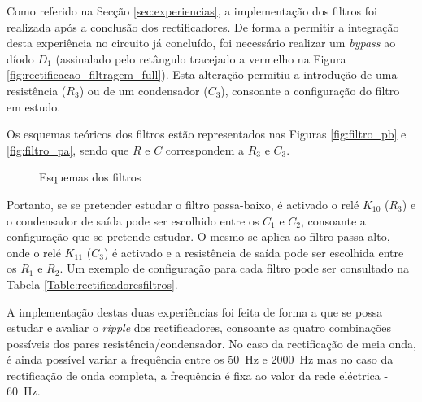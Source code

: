 Como referido na Secção \ref{sec:experiencias}, a implementação dos filtros foi realizada após a conclusão dos rectificadores. De forma a permitir a integração desta experiência no circuito já concluído, foi necessário realizar um \textit{bypass} ao díodo $D_{1}$ (assinalado pelo retângulo tracejado a vermelho na Figura \ref{fig:rectificacao_filtragem_full}). Esta alteração permitiu a introdução de uma resistência ($R_{3}$) ou de um condensador ($C_{3}$), consoante a configuração do filtro em estudo.

Os esquemas teóricos dos filtros estão representados nas Figuras \ref{fig:filtro_pb} e \ref{fig:filtro_pa}, sendo que $R$ e $C$  correspondem a $R_{3}$ e $C_{3}$.

\begin{figure}[hbtp]
	\centering%
		\centering
		\qquad
		\caption{Esquemas dos filtros \cite{sedrasmith}}%
		\label{fig:filtrosesqgeral}%
	\end{figure}

Portanto, se se pretender estudar o filtro passa-baixo, é activado o relé $K_{10}$ ($R_{3}$) e o condensador de saída pode ser escolhido entre os $C_{1}$ e $C_{2}$, consoante a configuração que se pretende estudar. O mesmo se aplica ao filtro passa-alto, onde o relé $K_{11}$ ($C_{3}$) é activado e a resistência de saída pode ser escolhida entre os $R_{1}$ e $R_{2}$. Um exemplo de configuração para cada filtro pode ser consultado na Tabela \ref{Table:rectificadoresfiltros}.


A implementação destas duas experiências foi feita de forma a que se possa estudar e avaliar o \textit{ripple} dos rectificadores, consoante as quatro combinações possíveis dos pares resistência/condensador. No caso da rectificação de meia onda, é ainda possível variar a frequência entre os \SI{50}{\hertz} e \SI{2000}{\hertz} mas no caso da rectificação de onda completa, a frequência é fixa ao valor da rede eléctrica - \SI{60}{\hertz}.

